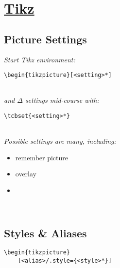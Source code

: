 \section{\href{http://mirrors.ctan.org/graphics/pgf/base/doc/pgfmanual.pdf}{Tikz}}

\subsection*{Picture Settings}
\begin{minipage}{6cm}

\textit{Start Tikz environment: }\\
\begin{lstlisting}[aboveskip=0pt]
\begin{tikzpicture}[<setting>*]
\end{lstlisting}\ \\

\textit{and $\Delta$ settings mid-course with:}\\
\begin{lstlisting}
\tcbset{<setting>*}
\end{lstlisting}
\end{minipage}\ \\

\textit{Possible settings are many, including: } \\
\begin{itemize}
    \item remember picture
    \item overlay
    \item {}
\end{itemize}
\ \\


\subsection*{Styles \& Aliases}
\begin{code}{6}
\begin{lstlisting}
\begin{tikzpicture}
    [<alias>/.style={<style>*}]
\end{lstlisting}
\end{code} \\


